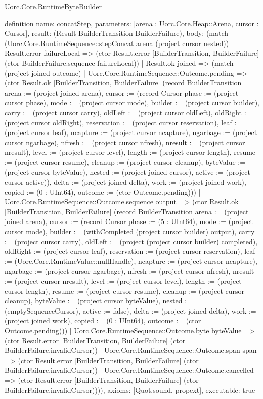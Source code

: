 \begin{lexlean}{Uorc.Core.RuntimeByteBuilder}
\begin{semanticmodule}
definition{
  name: concatStep,
  parameters: [arena : Uorc.Core.Heap::Arena, cursor : Cursor],
  result: (Result BuilderTransition BuilderFailure),
  body: (match (Uorc.Core.RuntimeSequence::stepConcat arena (project cursor nested))
    | Result.error failureLocal => (ctor Result.error [BuilderTransition, BuilderFailure] (ctor BuilderFailure.sequence failureLocal))
    | Result.ok joined => (match (project joined outcome)
      | Uorc.Core.RuntimeSequence::Outcome.pending => (ctor Result.ok [BuilderTransition, BuilderFailure] (record BuilderTransition {arena := (project joined arena), cursor := (record Cursor {phase := (project cursor phase), mode := (project cursor mode), builder := (project cursor builder), carry := (project cursor carry), oldLeft := (project cursor oldLeft), oldRight := (project cursor oldRight), reservation := (project cursor reservation), leaf := (project cursor leaf), ncapture := (project cursor ncapture), ngarbage := (project cursor ngarbage), nfresh := (project cursor nfresh), nresult := (project cursor nresult), level := (project cursor level), length := (project cursor length), resume := (project cursor resume), cleanup := (project cursor cleanup), byteValue := (project cursor byteValue), nested := (project joined cursor), active := (project cursor active)}), delta := (project joined delta), work := (project joined work), copied := (0 : UInt64), outcome := (ctor Outcome.pending)}))
      | Uorc.Core.RuntimeSequence::Outcome.sequence output => (ctor Result.ok [BuilderTransition, BuilderFailure] (record BuilderTransition {arena := (project joined arena), cursor := (record Cursor {phase := (5 : UInt64), mode := (project cursor mode), builder := (withCompleted (project cursor builder) output), carry := (project cursor carry), oldLeft := (project (project cursor builder) completed), oldRight := (project cursor leaf), reservation := (project cursor reservation), leaf := (Uorc.Core.RuntimeValue::nullHandle), ncapture := (project cursor ncapture), ngarbage := (project cursor ngarbage), nfresh := (project cursor nfresh), nresult := (project cursor nresult), level := (project cursor level), length := (project cursor length), resume := (project cursor resume), cleanup := (project cursor cleanup), byteValue := (project cursor byteValue), nested := (emptySequenceCursor), active := false}), delta := (project joined delta), work := (project joined work), copied := (0 : UInt64), outcome := (ctor Outcome.pending)}))
      | Uorc.Core.RuntimeSequence::Outcome.byte byteValue => (ctor Result.error [BuilderTransition, BuilderFailure] (ctor BuilderFailure.invalidCursor))
      | Uorc.Core.RuntimeSequence::Outcome.span span => (ctor Result.error [BuilderTransition, BuilderFailure] (ctor BuilderFailure.invalidCursor))
      | Uorc.Core.RuntimeSequence::Outcome.cancelled => (ctor Result.error [BuilderTransition, BuilderFailure] (ctor BuilderFailure.invalidCursor)))),
  axioms: [Quot.sound, propext],
  executable: true
}


\end{semanticmodule}
\end{lexlean}
